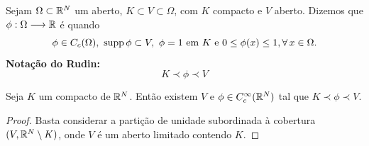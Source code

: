 \begin{frame}
\begin{defin}
Sejam \(\Omega\subset \mathbb{R}^N\) um aberto, \(K\subset V \subset \Omega\), com \(K\) compacto e \(V\) aberto. Dizemos que \(\phi:\Omega \longrightarrow \mathbb{R}\) é   quando 
\[ \phi\in C_c(\Omega),\ \operatorname{supp} \phi \subset V,\ \phi=1 \text{ em } K \text{ e }
 0\leq \phi(x)\leq 1, \forall\, x\in \Omega.\]
\textbf{Notação do Rudin:}
\[K\prec \phi \prec V\]
\end{defin}

\end{frame}

\begin{frame}

\begin{corol}\label{cut-off}
Seja $K$ um compacto de $\mathbb{R}^N$. Então existem \(V\) e \(\phi\in C^\infty_c(\mathbb{R}^N)\) tal que
\(K\prec \phi \prec V\).
\end{corol}
	\begin{proof}
		Basta considerar a partição de unidade subordinada à cobertura $(V,\mathbb{R}^N\setminus K)$, onde $V$ é um aberto limitado contendo $K$.
	\end{proof}

\end{frame}





